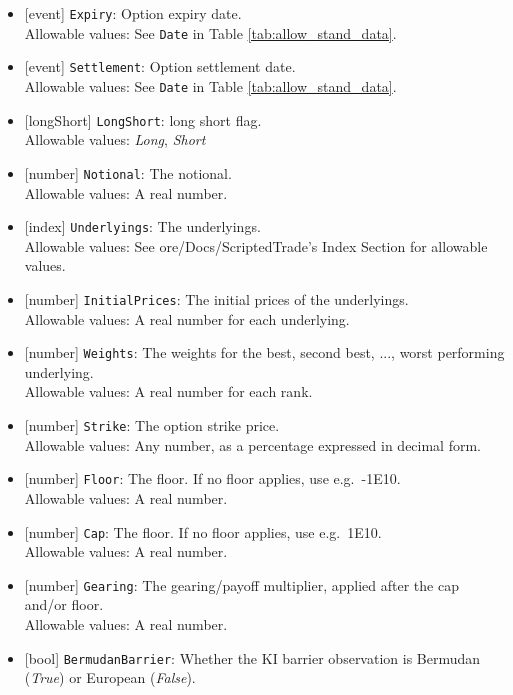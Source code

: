 \begin{itemize}
  \item{}[event] \lstinline!Expiry!: Option expiry date. \\
  Allowable values: See \lstinline!Date! in Table \ref{tab:allow_stand_data}.
  \item{}[event] \lstinline!Settlement!: Option settlement date. \\
  Allowable values: See \lstinline!Date! in Table \ref{tab:allow_stand_data}.
  \item{}[longShort] \lstinline!LongShort!: long short flag. \\
  Allowable values: \emph{Long}, \emph{Short}
  \item{}[number] \lstinline!Notional!: The notional. \\
  Allowable values: A real number.
  \item{}[index] \lstinline!Underlyings!: The underlyings. \\
  Allowable values: See ore/Docs/ScriptedTrade's Index Section for allowable values.
  \item{}[number] \lstinline!InitialPrices!: The initial prices of the underlyings.\\
  Allowable values: A real number for each underlying.
  \item{}[number] \lstinline!Weights!: The weights for the best, second best, ..., worst performing underlying.\\
  Allowable values: A real number for each rank.
  \item{}[number] \lstinline!Strike!: The option strike price. \\
  Allowable values: Any number, as a percentage expressed in decimal form.
  \item{}[number] \lstinline!Floor!: The floor. If no floor applies, use e.g.\ -1E10. \\
  Allowable values: A real number.
  \item{}[number] \lstinline!Cap!: The floor. If no floor applies, use e.g.\ 1E10. \\
  Allowable values: A real number.
  \item{}[number] \lstinline!Gearing!: The gearing/payoff multiplier, applied after the cap and/or floor. \\
  Allowable values: A real number.
  \item{}[bool] \lstinline!BermudanBarrier!: Whether the KI barrier observation is Bermudan (\emph{True}) or European
  (\emph{False}). \\

\end{itemize}
